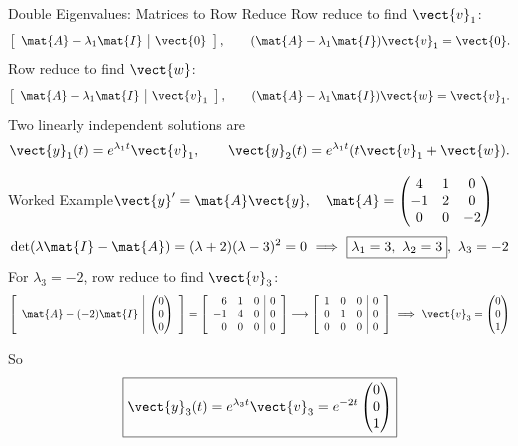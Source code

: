 \documentclass[11pt,aspectratio=169]{beamer}
\begin{document}
\begin{frame}{Double Eigenvalues: Matrices to Row Reduce}
Row reduce to find \(\vect{v}_1\):
\[
\left[\begin{array}{c|c}
\mat{A}-\lambda_1\mat{I}&\vect{0}
\end{array}\right],
\qquad
(\mat{A}-\lambda_1\mat{I})\vect{v}_1=\vect{0}.
\]
Row reduce to find \(\vect{w}\):
\[
\left[\begin{array}{c|c}
\mat{A}-\lambda_1\mat{I}&\vect{v}_1
\end{array}\right],
\qquad
(\mat{A}-\lambda_1\mat{I})\vect{w}=\vect{v}_1.
\]
Two linearly independent solutions are
\[
\vect{y}_1(t)=e^{\lambda_1 t}\vect{v}_1,\qquad
\vect{y}_2(t)=e^{\lambda_1 t}(t\vect{v}_1+\vect{w}).
\]
\end{frame}

\begingroup
{}
\begin{frame}{Worked Example\quad \(\vect{y}'=\mat{A}\vect{y},\quad \mat{A}=\begin{pmatrix}4&1&0\\-1&2&0\\0&0&-2\end{pmatrix}\)}
\small
\setlength{\abovedisplayskip}{3pt}
\setlength{\belowdisplayskip}{3pt}
\setlength{\jot}{1pt}
\renewcommand{\arraystretch}{0.85}
\[
\det(\lambda\mat{I}-\mat{A})=(\lambda+2)(\lambda-3)^2=0\ \Longrightarrow\ \boxed{\lambda_1=3,\ \lambda_2=3},\ \lambda_3=-2
\]
For \(\lambda_3=-2\), row reduce to find \(\vect{v}_3\):
\[
\left[\begin{array}{c|c}\mat{A}-(-2)\mat{I}&\begin{pmatrix}0\\0\\0\end{pmatrix}\end{array}\right]=\left[\begin{array}{rrr|r}6&1&0&0\\-1&4&0&0\\0&0&0&0\end{array}\right]
\longrightarrow
\left[\begin{array}{rrr|r}1&0&0&0\\0&1&0&0\\0&0&0&0\end{array}\right]
\ \Longrightarrow\ \vect{v}_3=\begin{pmatrix}0\\0\\1\end{pmatrix}
\]
\par\medskip
So
\[
\boxed{\vect{y}_3(t)=e^{\lambda_3 t}\vect{v}_3=e^{-2t}\begin{pmatrix}0\\0\\1\end{pmatrix}}
\]
\end{frame}
\end{document}
